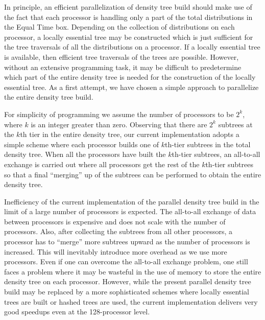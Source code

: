\commentoutA{\documentclass[prl,aps,twocolumn,twocolumngrid,superbib]{revtex4}}
\begin{document}
In principle, an efficient parallelization of density tree build
should make use of the fact that each processor is handling only a
part of the total distributions in the Equal Time box.  Depending on
the collection of distributions on each processor, a locally essential
tree may be constructed which is just sufficient for the tree
traversals of all the distributions on a
processor\cite{MWarren92,CGan03}.  If a locally essential tree is
available, then efficient tree traversals of the trees are possible.
However, without an extensive programming task, it may be difficult to
predetermine which part of the entire density tree is needed for the
construction of the locally essential tree. As a first attempt, we
have chosen a simple approach to parallelize the entire density tree
build.

For simplicity of programming we assume the number of processors to be
$2^k$, where $k$ is an integer greater than zero.  Observing that
there are $2^k$ subtrees at the $k$th tier in the entire density tree,
our current implementation adopts a simple scheme where each processor
builds one of $k$th-tier subtrees in the total density tree. When all
the processors have built the $k$th-tier subtrees, an all-to-all
exchange is carried out where all processors get the rest of the
$k$th-tier subtrees so that a final ``merging'' up of the
subtrees\cite{MChallacombe97,CTymczak04a} can be performed to obtain
the entire density tree.

Inefficiency of the current implementation of the parallel density
tree build in the limit of a large number of processors is expected.
The all-to-all exchange of data between processors is expensive and
does not scale with the number of processors. Also, after collecting
the subtrees from all other processors, a processor has to ``merge''
more subtrees upward as the number of processors is increased. This
will inevitably introduce more overhead as we use more processors.
Even if one can overcome the all-to-all exchange problem, one still
faces a problem where it may be wasteful in the use of memory to store
the entire density tree on each processor.  However, while the present
parallel density tree build may be replaced by a more sophisticated
schemes where locally essential trees are built\cite{MWarren92} or
hashed trees are used\cite{MWarren93,MWarren95b}, the current
implementation delivers very good speedups even at the 128-processor
level.
\end{document}
